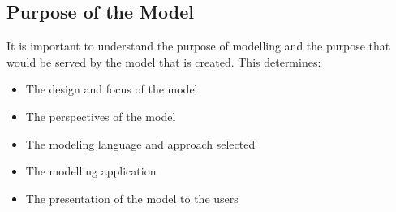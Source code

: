 \subsection{Purpose of the Model}
It is important to understand the purpose of modelling and the purpose that would be served by the model that is created. This determines:
\begin{itemize}
\item The design and focus of the model
\item The perspectives of the model
\item The modeling language and approach selected
\item The modelling application
\item The presentation of the model to the users
\end{itemize}